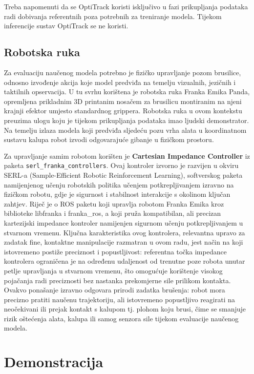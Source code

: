 \documentclass[times, utf8, diplomski]{fer}
\begin{document}
Treba napomenuti da se OptiTrack koristi isključivo u fazi prikupljanja podataka radi dobivanja referentnih poza potrebnih za treniranje modela. Tijekom inferencije sustav OptiTrack se ne koristi.

\section{Robotska ruka}
Za evaluaciju naučenog modela potrebno je fizičko upravljanje pozom brusilice, odnosno izvođenje akcija koje model predviđa na temelju vizualnih, jezičnih i taktilnih opservacija. U tu svrhu korištena je robotska ruka Franka Emika Panda, opremljena prikladnim 3D printanim nosačem za brusilicu montiranim na njeni krajnji efektor umjesto standardnog grippera. Robotska ruka u ovom kontekstu preuzima ulogu koju je tijekom prikupljanja podataka imao ljudski demonstrator. Na temelju izlaza modela koji predviđa sljedeću pozu vrha alata u koordinatnom sustavu kalupa robot izvodi odgovarajuće gibanje u fizičkom prostoru.
 
Za upravljanje samim robotom korišten je \textbf{Cartesian Impedance Controller} iz paketa \texttt{serl\_franka\_controllers}. Ovaj kontroler izvorno je razvijen u okviru SERL-a (Sample-Efficient Robotic Reinforcement Learning), \cite{luo2025serlsoftwaresuitesampleefficient} softverskog paketa namijenjenog učenju robotskih politika učenjem potkrepljivanjem izravno na fizičkom robotu, gdje je sigurnost i stabilnost interakcije s okolinom ključan zahtjev. Riječ je o ROS paketu koji upravlja robotom Franka Emika kroz biblioteke libfranka i franka\_ros, a koji pruža kompatibilan, ali precizan kartezijski impedance kontroler namijenjen sigurnom učenju potkrepljivanjem u stvarnom vremenu. Ključna karakteristika ovog kontrolera, relevantna upravo za zadatak fine, kontaktne manipulacije razmatran u ovom radu, jest način na koji istovremeno postiže preciznost i popustljivost: referentna točka impedance kontrolera ograničena je na određenu udaljenost od trenutne poze robota unutar petlje upravljanja u stvarnom vremenu, što omogućuje korištenje visokog pojačanja radi preciznosti bez nastanka prekomjerne sile prilikom kontakta. Ovakvo ponašanje izravno odgovara prirodi zadatka brušenja: robot mora precizno pratiti naučenu trajektoriju, ali istovremeno popustljivo reagirati na neočekivani ili prejak kontakt s kalupom tj. plohom koju brusi, čime se smanjuje rizik oštećenja alata, kalupa ili samog senzora sile tijekom evaluacije naučenog modela.

\chapter{Demonstracija}
\end{document}
